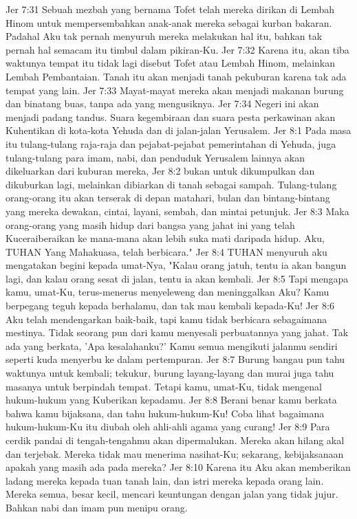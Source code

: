Jer 7:31  Sebuah mezbah yang bernama Tofet telah mereka dirikan di Lembah Hinom untuk mempersembahkan anak-anak mereka sebagai kurban bakaran. Padahal Aku tak pernah menyuruh mereka melakukan hal itu, bahkan tak pernah hal semacam itu timbul dalam pikiran-Ku.
Jer 7:32  Karena itu, akan tiba waktunya tempat itu tidak lagi disebut Tofet atau Lembah Hinom, melainkan Lembah Pembantaian. Tanah itu akan menjadi tanah pekuburan karena tak ada tempat yang lain.
Jer 7:33  Mayat-mayat mereka akan menjadi makanan burung dan binatang buas, tanpa ada yang mengusiknya.
Jer 7:34  Negeri ini akan menjadi padang tandus. Suara kegembiraan dan suara pesta perkawinan akan Kuhentikan di kota-kota Yehuda dan di jalan-jalan Yerusalem.
Jer 8:1  Pada masa itu tulang-tulang raja-raja dan pejabat-pejabat pemerintahan di Yehuda, juga tulang-tulang para imam, nabi, dan penduduk Yerusalem lainnya akan dikeluarkan dari kuburan mereka,
Jer 8:2  bukan untuk dikumpulkan dan dikuburkan lagi, melainkan dibiarkan di tanah sebagai sampah. Tulang-tulang orang-orang itu akan terserak di depan matahari, bulan dan bintang-bintang yang mereka dewakan, cintai, layani, sembah, dan mintai petunjuk.
Jer 8:3  Maka orang-orang yang masih hidup dari bangsa yang jahat ini yang telah Kuceraiberaikan ke mana-mana akan lebih suka mati daripada hidup. Aku, TUHAN Yang Mahakuasa, telah berbicara."
Jer 8:4  TUHAN menyuruh aku mengatakan begini kepada umat-Nya, "Kalau orang jatuh, tentu ia akan bangun lagi, dan kalau orang sesat di jalan, tentu ia akan kembali.
Jer 8:5  Tapi mengapa kamu, umat-Ku, terus-menerus menyeleweng dan meninggalkan Aku? Kamu berpegang teguh kepada berhalamu, dan tak mau kembali kepada-Ku!
Jer 8:6  Aku telah mendengarkan baik-baik, tapi kamu tidak berbicara sebagaimana mestinya. Tidak seorang pun dari kamu menyesali perbuatannya yang jahat. Tak ada yang berkata, 'Apa kesalahanku?' Kamu semua mengikuti jalanmu sendiri seperti kuda menyerbu ke dalam pertempuran.
Jer 8:7  Burung bangau pun tahu waktunya untuk kembali; tekukur, burung layang-layang dan murai juga tahu masanya untuk berpindah tempat. Tetapi kamu, umat-Ku, tidak mengenal hukum-hukum yang Kuberikan kepadamu.
Jer 8:8  Berani benar kamu berkata bahwa kamu bijaksana, dan tahu hukum-hukum-Ku! Coba lihat bagaimana hukum-hukum-Ku itu diubah oleh ahli-ahli agama yang curang!
Jer 8:9  Para cerdik pandai di tengah-tengahmu akan dipermalukan. Mereka akan hilang akal dan terjebak. Mereka tidak mau menerima nasihat-Ku; sekarang, kebijaksanaan apakah yang masih ada pada mereka?
Jer 8:10  Karena itu Aku akan memberikan ladang mereka kepada tuan tanah lain, dan istri mereka kepada orang lain. Mereka semua, besar kecil, mencari keuntungan dengan jalan yang tidak jujur. Bahkan nabi dan imam pun menipu orang.
